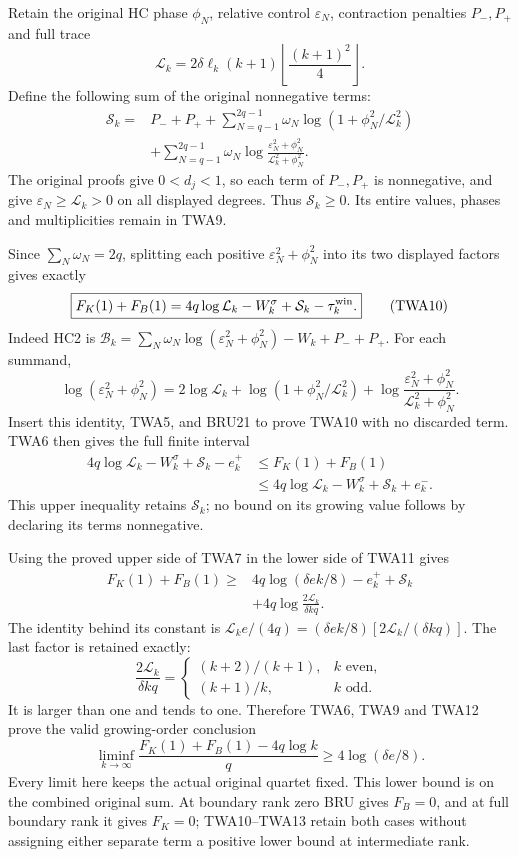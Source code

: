 \documentclass[11pt,a4paper]{article}
\begin{document}
Retain the original HC phase $\phi_N$, relative control
$\varepsilon_N$, contraction penalties $P_-,P_+$ and full trace
\[
\mathcal L_k=2\delta\ell_k(k+1)
                  \left\lfloor\frac{(k+1)^2}{4}\right\rfloor.
\]
Define the following sum of the original nonnegative terms:
\[
\begin{aligned}
\mathcal S_k={}&P_-+P_+
 +\sum_{N=q-1}^{2q-1}\omega_N
                   \log(1+\phi_N^2/\mathcal L_k^2)\\
&+\sum_{N=q-1}^{2q-1}\omega_N
       \log\frac{\varepsilon_N^2+\phi_N^2}
                    {\mathcal L_k^2+\phi_N^2}.
\end{aligned}\tag{TWA9}
\]
The original proofs give $0<d_j<1$, so each term of $P_-,P_+$
is nonnegative, and give $\varepsilon_N\ge\mathcal L_k>0$ on all
displayed degrees. Thus $\mathcal S_k\ge0$. Its entire values,
phases and multiplicities remain in TWA9.

Since $\sum_N\omega_N=2q$, splitting each positive
$\varepsilon_N^2+\phi_N^2$ into its two displayed factors gives
exactly
\[
\boxed{F_K(1)+F_B(1)
 =4q\log\mathcal L_k-W_k^\sigma
                      +\mathcal S_k-\tau_k^{\rm win}.}
\tag{TWA10}
\]
Indeed HC2 is $\mathcal B_k=\sum_N\omega_N
\log(\varepsilon_N^2+\phi_N^2)-W_k+P_-+P_+$.
For each summand,
\[
\log(\varepsilon_N^2+\phi_N^2)
=2\log\mathcal L_k+\log(1+\phi_N^2/\mathcal L_k^2)
 +\log\frac{\varepsilon_N^2+\phi_N^2}
                   {\mathcal L_k^2+\phi_N^2}.
\]
Insert this identity, TWA5, and BRU21 to prove TWA10 with no
discarded term. TWA6 then gives the full finite interval
\[
\begin{aligned}
4q\log\mathcal L_k-W_k^\sigma+\mathcal S_k-e_k^+
&\le F_K(1)+F_B(1)\\
&\le4q\log\mathcal L_k-W_k^\sigma+\mathcal S_k+e_k^-.
\end{aligned}\tag{TWA11}
\]
This upper inequality retains $\mathcal S_k$; no bound on its
growing value follows by declaring its terms nonnegative.

Using the proved upper side of TWA7 in the lower side of TWA11 gives
\[
\begin{aligned}
F_K(1)+F_B(1)\ge{}&4q\log(\delta e k/8)-e_k^++\mathcal S_k\\
&+4q\log\frac{2\mathcal L_k}{\delta kq}.
\end{aligned}\tag{TWA12}
\]
The identity behind its constant is
$\mathcal L_k e/(4q)=(\delta e k/8)
[2\mathcal L_k/(\delta kq)]$. The last factor is retained exactly:
\[
\frac{2\mathcal L_k}{\delta kq}
=\begin{cases}(k+2)/(k+1),&k\text{ even},\\
(k+1)/k,&k\text{ odd}.
\end{cases}
\]
It is larger than one and tends to one. Therefore TWA6, TWA9 and
TWA12 prove the valid growing-order conclusion
\[
\boxed{\liminf_{k\to\infty}
\frac{F_K(1)+F_B(1)-4q\log k}{q}
\ge4\log(\delta e/8).}\tag{TWA13}
\]
Every limit here keeps the actual original quartet fixed. This
lower bound is on the combined original sum. At boundary rank zero
BRU gives $F_B=0$, and at full boundary rank it gives $F_K=0$;
TWA10--TWA13 retain both cases without assigning either separate
term a positive lower bound at intermediate rank.
\end{document}
